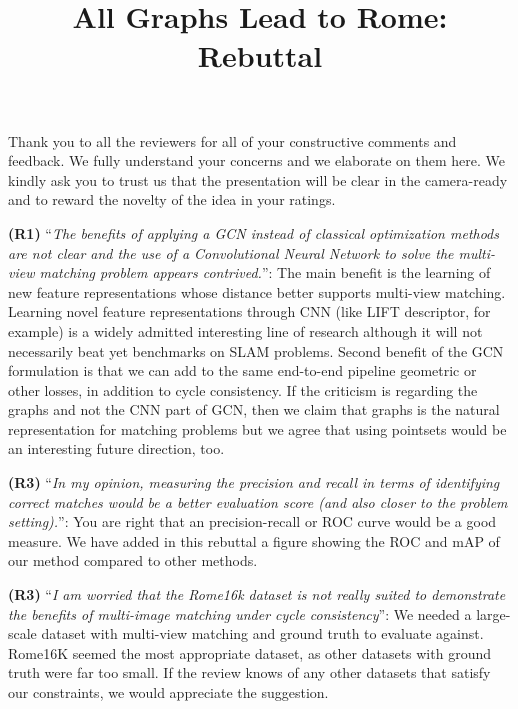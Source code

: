 \documentclass[10pt,twocolumn,letterpaper]{article}
\begin{document}
\title{All Graphs Lead to Rome: Rebuttal}  %

\maketitle
\thispagestyle{empty}

Thank you to all the reviewers for all of your constructive comments and feedback.
We fully understand your concerns and we elaborate on them here.
We kindly ask you to trust us that the presentation will be clear in
the camera-ready and to reward the novelty of the idea in your ratings.

\textbf{(R1)} ``\textit{The benefits of applying a GCN instead of classical optimization methods are not clear and the use of a Convolutional Neural Network to solve the multi-view matching problem appears contrived.}'':
The main benefit is the learning of new feature representations whose distance better supports multi-view matching. Learning novel feature representations through CNN (like LIFT descriptor, for example) is a widely admitted interesting line of research although it will not necessarily beat yet benchmarks on SLAM problems. Second benefit of the GCN formulation is that we can add to the same end-to-end pipeline geometric or other losses, in addition to cycle consistency. If the criticism is regarding the graphs and not the CNN part of GCN, then we claim that graphs is the natural representation for matching problems but we agree that using pointsets would be an interesting future direction, too.

\textbf{(R3)} ``\textit{In my opinion, measuring the precision and recall in terms of identifying correct matches would be a better evaluation score (and also closer to the problem setting).}'':
You are right that an precision-recall or ROC curve would be a good measure. We have added in this rebuttal a figure showing the ROC and mAP of our method compared to other methods.

\textbf{(R3)} ``\textit{I am worried that the Rome16k dataset is not really suited to demonstrate the benefits of multi-image matching under cycle consistency}'':
We needed a large-scale dataset with multi-view matching and ground truth to evaluate against. Rome16K seemed the most appropriate dataset, as other datasets with ground truth were far too small. If the review knows of any other datasets that satisfy our constraints, we would appreciate the suggestion.
\end{document}
